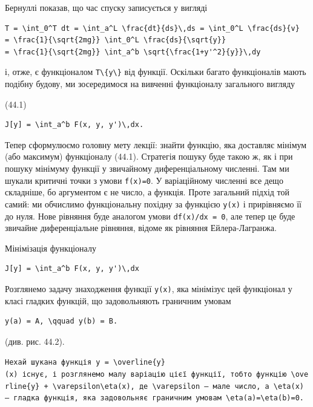 \documentclass[
  ukrainian,
]{article}
\begin{document}
Бернуллі показав, що час спуску записується у вигляді

\begin{verbatim}
T = \int_0^T dt = \int_a^L \frac{dt}{ds}\,ds = \int_0^L \frac{ds}{v}
= \frac{1}{\sqrt{2mg}} \int_0^L \frac{ds}{\sqrt{y}}
= \frac{1}{\sqrt{2mg}} \int_a^b \sqrt{\frac{1+y'^2}{y}}\,dy
\end{verbatim}

і, отже, є функціоналом \texttt{T\textbackslash{}\{y\textbackslash{}\}}
від функції. Оскільки багато функціоналів мають подібну будову, ми
зосередимося на вивченні функціоналу загального вигляду

(44.1)

\begin{verbatim}
J[y] = \int_a^b F(x, y, y')\,dx.
\end{verbatim}

Тепер сформулюємо головну мету лекції: знайти функцію, яка доставляє
мінімум (або максимум) функціоналу (44.1). Стратегія пошуку буде такою
ж, як і при пошуку мінімуму функції у звичайному диференціальному
численні. Там ми шукали критичні точки з умови
\texttt{f\textquotesingle{}(x)=0}. У варіаційному численні все дещо
складніше, бо аргументом є не число, а функція. Проте загальний підхід
той самий: ми обчислимо функціональну похідну за функцією \texttt{y(x)}
і прирівняємо її до нуля. Нове рівняння буде аналогом умови
\texttt{df(x)/dx\ =\ 0}, але тепер це буде звичайне диференціальне
рівняння, відоме як рівняння Ейлера-Лагранжа.

Мінімізація функціоналу

\begin{verbatim}
J[y] = \int_a^b F(x, y, y')\,dx
\end{verbatim}

Розглянемо задачу знаходження функції \texttt{y(x)}, яка мінімізує цей
функціонал у класі гладких функцій, що задовольняють граничним умовам

\begin{verbatim}
y(a) = A, \qquad y(b) = B.
\end{verbatim}

(див. рис. 44.2).

\texttt{Нехай\ шукана\ функція\ \textquotesingle{}y\ =\ \textbackslash{}overline\{y\}(x)\textquotesingle{}\ існує,\ і\ розглянемо\ малу\ варіацію\ цієї\ функції,\ тобто\ функцію\ \textquotesingle{}\textbackslash{}overline\{y\}\ +\ \textbackslash{}varepsilon\textbackslash{}eta(x)\textquotesingle{},\ де\ \textquotesingle{}\textbackslash{}varepsilon\textquotesingle{}\ —\ мале\ число,\ а\ \textquotesingle{}\textbackslash{}eta(x)\textquotesingle{}\ —\ гладка\ функція,\ яка\ задовольняє\ граничним\ умовам\ \textquotesingle{}\textbackslash{}eta(a)=\textbackslash{}eta(b)=0\textquotesingle{}.}
\end{document}
